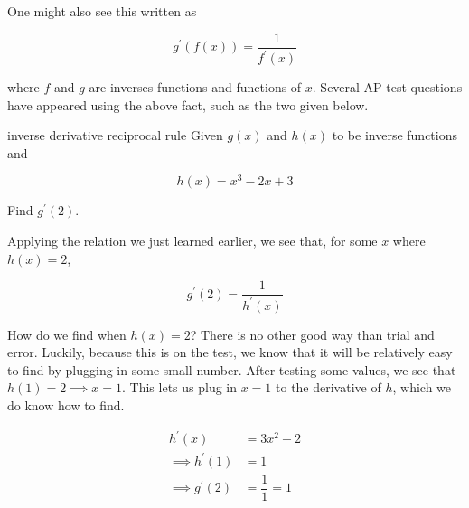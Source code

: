One might also see this written as

\[ g^\prime \left( f \left( x \right) \right) = \dfrac{1}{f^\prime \left( x \right)} \]

where \( f \) and \( g \) are inverses functions and functions of \( x \). Several AP test questions have appeared using the above fact, such as the two given below.

\begin{example}{inverse derivative reciprocal rule}
    Given \( g \left( x \right) \) and \( h \left( x \right) \) to be inverse functions and
    
    \[ h \left( x \right) = x^3 - 2x + 3 \]
    
    Find \( g^\prime \left( 2 \right) \).
    
    Applying the relation we just learned earlier, we see that, for some \( x \) where \( h \left( x \right) = 2 \),

    \[ g^\prime \left( 2 \right) = \dfrac{1}{h^\prime \left( x \right)} \]
    
    How do we find when \( h \left( x \right) = 2 \)? There is no other good way than trial and error. Luckily, because this is on the test, we know that it will be relatively easy to find by plugging in some small number. After testing some values, we see that \( h \left( 1 \right) = 2 \implies x = 1 \). This lets us plug in \( x = 1 \) to the derivative of \( h \), which we do know how to find.
    
    \begin{align}
        h^\prime \left( x \right) &= 3x^2 - 2 \\
        \implies h^\prime \left( 1 \right) &= 1 \\
        \implies g^\prime \left( 2 \right) &= \dfrac{1}{1} = 1
    \end{align}
\end{example}

